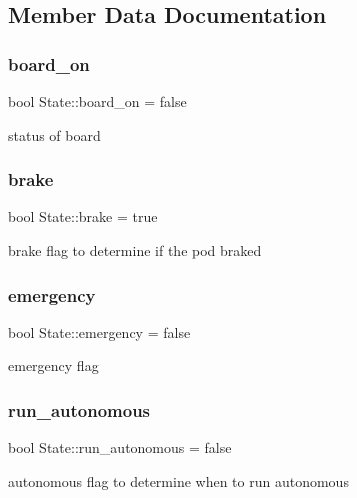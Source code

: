 \subsection{Member Data Documentation}
\mbox{\label{class_state_aea23ca3e3e9162382305d332c04f409b}} 
\subsubsection{\texorpdfstring{board\+\_\+on}{board\_on}}
{\footnotesize\ttfamily bool State\+::board\+\_\+on = false}

status of board \mbox{\label{class_state_a3c08a5989b34e5ee4c43be5ecba050a1}} 
\subsubsection{\texorpdfstring{brake}{brake}}
{\footnotesize\ttfamily bool State\+::brake = true}

brake flag to determine if the pod braked \mbox{\label{class_state_a8d0db4a728e3b0c0d1f295c206526e46}} 
\subsubsection{\texorpdfstring{emergency}{emergency}}
{\footnotesize\ttfamily bool State\+::emergency = false}

emergency flag \mbox{\label{class_state_a21ad44ffdf756efb9a207d4e80b7e248}} 
\subsubsection{\texorpdfstring{run\+\_\+autonomous}{run\_autonomous}}
{\footnotesize\ttfamily bool State\+::run\+\_\+autonomous = false}

autonomous flag to determine when to run autonomous \mbox{\label{class_state_a2df36af0379e3d8608272150fce0ce7d}} 
